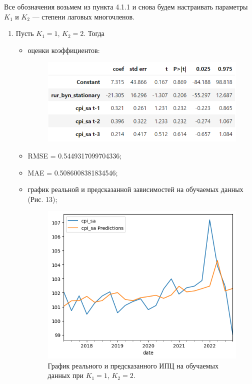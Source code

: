 \documentclass[a4paper, 12pt]{extarticle}
\begin{document}
		Все обозначения возьмем из пункта 4.1.1 и снова будем настраивать параметры $K_1$ и $K_2$ --- степени лаговых многочленов.	
		\begin{enumerate}
			\item Пусть $K_1 = 1$, $K_2 = 2$. Тогда
			\begin{itemize}
				\item оценки коэффициентов:
				\begin{figure}[h!]
					\centering
					\includegraphics[scale=1.1]{images/tab_9}
					\label{fig:tab9}
				\end{figure}
				
				\item RMSE = 0.5449317099704336;
				\item MAE = 0.5086008381834546;
				
				\item график реальной и предсказанной зависимостей на обучаемых данных  (Рис. 13); 
				\begin{figure}[h!]
					\centering
					\includegraphics[scale=0.8]{images/pic_13}
					\caption[Рис. 13]{График реального и предсказанного ИПЦ на обучаемых данных при $K_1 = 1$, $K_2 = 2$.}
					\label{fig:pic13}
				\end{figure}
				

\end{itemize}
\end{enumerate}
\end{document}
